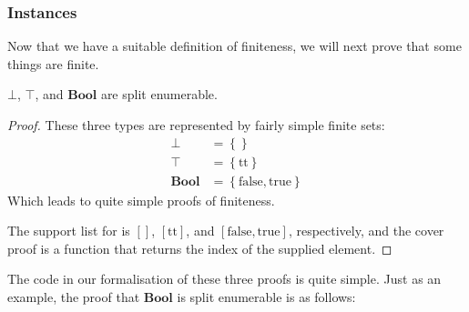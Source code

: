 \subsubsection{Instances}
Now that we have a suitable definition of finiteness, we will next prove that
some things are finite.
\begin{lemma}
  \(\bot\), \(\top\), and \(\mathbf{Bool}\) are split enumerable.
\end{lemma}
\begin{proof}
  These three types are represented by fairly simple finite sets:
  \begin{align}
    \bot &= \left\{  \right\} \\
    \top &= \left\{ \text{tt}  \right\} \\
    \mathbf{Bool} &= \left\{  \text{false}, \text{true} \right\}
  \end{align}
  Which leads to quite simple proofs of finiteness.

  The support list for is \(\left[  \right]\), \(\left[ \text{tt} \right]\), and
  \(\left[ \text{false}, \text{true} \right]\), respectively, and the cover
  proof is a function that returns the index of the supplied element.
\end{proof}
\begin{agdalisting}
  The code in our formalisation of these three proofs is quite simple.
  Just as an example, the proof that \(\mathbf{Bool}\) is split enumerable is as
  follows:
\end{agdalisting}

